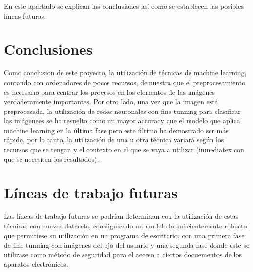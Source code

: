  \label{capitulo7}

En este apartado se explican las conclusiones así como se establecen las posibles líneas futuras.

\section{Conclusiones}
Como conclusion de este proyecto, la utilización de técnicas de machine learning, contando con ordenadores de pocos recursos, demuestra que el preprocesamiento
es necesario para centrar los procesos en los elementos de las imágenes verdaderamente importantes. Por otro lado, una vez que la imagen está preprocesada, la utilización 
de redes neuronales con fine tunning para clasificar las imágenees se ha resuelto como un mayor accuracy que el modelo que aplica machine learning en la última fase
pero este último ha demostrado ser más rápido, por lo tanto, la utilización de una u otra técnica variará según los recursos que se tengan y el contexto en el que se 
vaya a utilizar (inmediatex con que se necesiten los resultados).



\section{Líneas de trabajo futuras}

Las líneas de trabajo futuras se podrían determinan con la utilización de estas técnicas con nuevos datasets, consiiguiendo un modelo lo suficientemente robusto
que permitiese su utilización en un programa de escritorio, con una primera fase de fine tunning con imágenes del ojo del usuario y una segunda fase donde este 
se utilizase como método de seguridad para el acceso a ciertos docuementos de los aparatos electrónicos.
